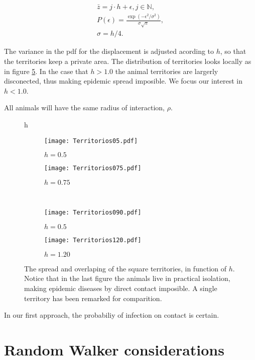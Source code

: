 \documentclass[letterpaperr,12pt]{article}
\begin{document}
\begin{gather}
\bar{z}= j \cdot h + \epsilon, j\in \mathbb{N},\\
P(\epsilon)=\frac{\exp(-\epsilon^2/\sigma^2)}{\sigma\sqrt{\pi}}, \\
\sigma=h/4.
\end{gather}

The variance in the pdf for the displacement is
adjusted acording to $h$, so that the territories keep
a private area. The distribution of territories looks
locally as in figure \ref{territories}.
In the case that $h > 1.0$ the animal territories
are largerly disconected, thus making epidemic spread
imposible. We focus our interest in  $h<1.0$.

All animals will have the same radius of interaction, $\rho$.

\begin{figure}{h}
 \centering
  \begin{subfigure}[b]{0.4\textwidth}
    \centering
    \texttt{[image: Territorios05.pdf]}
    \caption{$h=0.5$}
    \label{h05}
  \end{subfigure}
  \begin{subfigure}[b]{0.40\textwidth}
    \centering
    \texttt{[image: Territorios075.pdf]}
    \caption{$h=0.75$}
    \label{h075}
  \end{subfigure}
 \\ 
 \centering
  \begin{subfigure}[b]{0.40\textwidth}
    \centering
    \texttt{[image: Territorios090.pdf]}
    \caption{$h=0.5$}
    \label{h09}
  \end{subfigure}
  \begin{subfigure}[b]{0.40\textwidth}
    \centering
    \texttt{[image: Territorios120.pdf]}
    \caption{$h=1.20$}
    \label{h075}
  \end{subfigure}
  \caption{ The spread and overlaping of the square
territories, in function of $h$. Notice that
in the last figure the animals live in practical isolation,
making epidemic diseases by direct contact imposible. A single
territory has been remarked for comparition.}\label{territories}
\end{figure}

In our first approach, the probabiliy of infection
on contact is certain. 


\section{Random Walker considerations}
\end{document}
